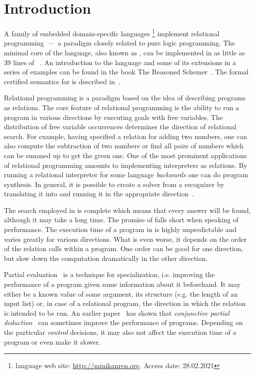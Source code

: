 \section{Introduction}
\label{intro}

A family of embedded domain-specific languages \mk\footnote{\mk language web site: \url{http://minikanren.org}. Access date: 28.02.2021} implement relational programming~---~a paradigm closely related to pure logic programming.
The minimal core of the language, also known as \muk, can be implemented in as little as 39 lines of \scheme~\cite{friedmanmukanren}.
An introduction to the language and some of its extensions in a series of examples can be found in the book The Reasoned Schemer~\cite{TheReasonedSchemer}.
The formal certified semantics for \mk is described in~\cite{rozplokhas2020certified}.

Relational programming is a paradigm based on the idea of describing programs as relations.
The core feature of relational programming is the ability to run a program in various directions by executing goals with free variables.
The distribution of free variable occurrences determines the direction of relational search.
For example, having specified a relation for adding two numbers, one can also compute the subtraction of two numbers or find all pairs of numbers which can be summed up to get the given one.
One of the most prominent applications of relational programming amounts to implementing interpreters as relations.
By running a relational interpreter for some language \emph{backwards} one can do program synthesis.
In general, it is possible to create a solver from a recognizer by translating it into \mk and running it in the appropriate direction~\cite{lozov2019relational}.

The search employed in \mk is complete which means that every answer will be found, although it may take a long time.
The promise of \mk falls short when speaking of performance.
The execution time of a program in \mk is highly unpredictable and varies greatly for various directions.
What is even worse, it depends on the order of the relation calls within a program.
One order can be good for one direction, but slow down the computation dramatically in the other direction.

Partial evaluation~\cite{jonesbook} is a technique for specialization, i.e. improving the performance of a program given some information about it beforehand.
It may either be a known value of some argument, its structure (e.g. the length of an input list) or, in case of a relational program, the direction in which the relation is intended to be run.
An earlier paper~\cite{lozov2019relational} has shown that \emph{conjunctive partial deduction}~\cite{de1999conjunctive} can sometimes improve the performance of \mk programs.
Depending on the particular \emph{control} decisions, it may also not affect the execution time of a program or even make it slower.

